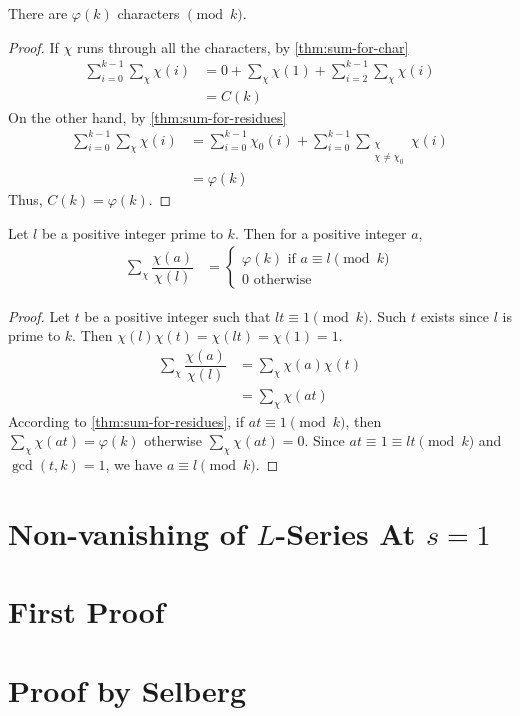 \documentclass[elemannt.tex]{subfile}
\begin{document}
		\begin{theorem}
			There are $\varphi(k)$ characters $\pmod{k}$.
		\end{theorem}

		\begin{proof}
			If $\chi$ runs through all the characters, by \autoref{thm:sum-for-char}
				\begin{align*}
					\sum_{i=0}^{k-1}\sum_{\chi}\chi(i)
						& = 0+\sum_{\chi}\chi(1)+\sum_{i=2}^{k-1}\sum_{\chi}\chi(i)\\
						& = C(k)
				\end{align*}
			On the other hand, by \autoref{thm:sum-for-residues}
				\begin{align*}
					\sum_{i=0}^{k-1}\sum_{\chi}\chi(i)
						& = \sum_{i=0}^{k-1}\chi_{0}(i)+\sum_{i=0}^{k-1}\sum_{\substack{\chi\\\chi\neq\chi_{0}}}\chi(i)\\
						& = \varphi(k)
				\end{align*}
			Thus, $C(k)=\varphi(k)$.
		\end{proof}

		\begin{theorem}
			Let $l$ be a positive integer prime to $k$. Then for a positive integer $a$,
				\begin{align*}
					\sum_{\chi}\dfrac{\chi(a)}{\chi(l)}
						& =
							\begin{cases}
								\varphi(k)\mbox{ if }a\equiv l\pmod{k}\\
								0\mbox{ otherwise}
							\end{cases}
				\end{align*}
		\end{theorem}

		\begin{proof}
			Let $t$ be a positive integer such that $lt\equiv1\pmod{k}$. Such $t$ exists since $l$ is prime to $k$. Then $\chi(l)\chi(t)=\chi(lt)=\chi(1)=1$.
				\begin{align*}
					\sum_{\chi}\dfrac{\chi(a)}{\chi(l)}
						& = \sum_{\chi}\chi(a)\chi(t)\\
						& = \sum_{\chi}\chi(at)
				\end{align*}
			According to \autoref{thm:sum-for-residues}, if $at\equiv1\pmod{k}$, then $\sum_{\chi}\chi(at)=\varphi(k)$ otherwise $\sum_{\chi}\chi(at)=0$. Since $at\equiv1\equiv lt\pmod{k}$ and $\gcd(t,k)=1$, we have $a\equiv l\pmod{k}$.
		\end{proof}
	\section{Non-vanishing of $L$-Series At $s=1$}
	\section{First Proof}
	\section{Proof by Selberg}
\end{document}
